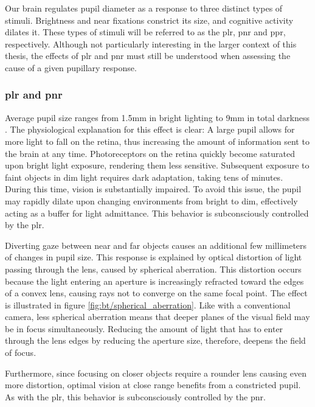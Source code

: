 
Our brain regulates pupil diameter as a response to three distinct types of stimuli. Brightness and near fixations constrict its size, and cognitive activity dilates it. These types of stimuli will be referred to as the \acrfull{plr}, \acrfull{pnr} and \acrfull{ppr}, respectively. Although not particularly interesting in the larger context of this thesis, the effects of \acrshort{plr} and \acrshort{pnr} must still be understood when assessing the cause of a given pupillary response. 

\subsubsection{\acrfull{plr} and \acrfull{pnr}} \label{sec:bt/cognitive_impacts/plr_pnr}

Average pupil size ranges from 1.5mm in bright lighting to 9mm in total darkness \cite{eckstein2017}. The physiological explanation for this effect is clear: A large pupil allows for more light to fall on the retina, thus increasing the amount of information sent to the brain at any time. Photoreceptors on the retina quickly become saturated upon bright light exposure, rendering them less sensitive. Subsequent exposure to faint objects in dim light requires dark adaptation, taking tens of minutes. During this time, vision is substantially impaired. To avoid this issue, the pupil may rapidly dilate upon changing environments from bright to dim, effectively acting as a buffer for light admittance. This behavior is subconsciously controlled by the \acrshort{plr}.

Diverting gaze between near and far objects causes an additional few millimeters of changes in pupil size. This response is explained by optical distortion of light passing through the lens, caused by spherical aberration. This distortion occurs because the light entering an aperture is increasingly refracted toward the edges of a convex lens, causing rays not to converge on the same focal point. The effect is illustrated in figure \ref{fig:bt/spherical_aberration}. Like with a conventional camera, less spherical aberration means that deeper planes of the visual field may be in focus simultaneously. Reducing the amount of light that has to enter through the lens edges by reducing the aperture size, therefore, deepens the field of focus.

Furthermore, since focusing on closer objects require a rounder lens causing even more distortion, optimal vision at close range benefits from a constricted pupil. As with the \acrshort{plr}, this behavior is subconsciously controlled by the \acrshort{pnr}.

